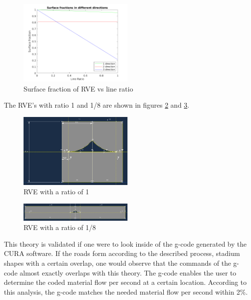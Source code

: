 \begin{figure}[H]
    \centering
    \includegraphics[width=0.5\textwidth]{chapter_4_RVE_Definition/figures/Surfacefraction.png}
    \caption{Surface fraction of RVE vs line ratio}
    \label{fig:Surfacefraction}
\end{figure}

The RVE's with ratio 1 and 1/8 are shown in figures \ref{fig:RVE1} and \ref{fig:RVE1/8}.
\begin{figure}[H]
    \centering
    \includegraphics[width=0.5\textwidth]{chapter_4_RVE_Definition/figures/RVER1.png}
    \caption{RVE with a ratio of 1}
    \label{fig:RVE1}
\end{figure}

\begin{figure}[H]
    \centering
    \includegraphics[width=0.5\textwidth]{chapter_4_RVE_Definition/figures/RVER8.png}
    \caption{RVE with a ratio of 1/8}
    \label{fig:RVE1/8}
\end{figure}

This theory is validated if one were to look inside of the g-code generated by the CURA software. If the roads form according to the described process, stadium shapes with a certain overlap, one would observe that the commands of the g-code almost exactly overlaps with this theory. The g-code enables the user to determine the coded material flow per second at a certain location. According to this analysis, the g-code matches the needed material flow per second within 2\%.


